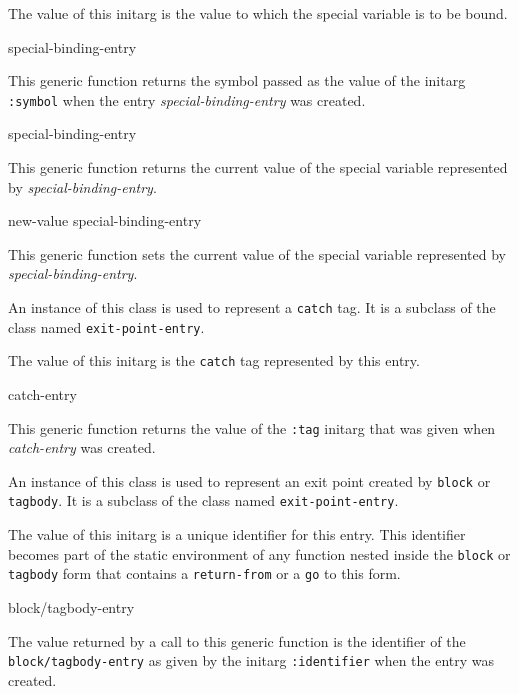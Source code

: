 
The value of this initarg is the value to which the special variable
is to be bound.

 {special-binding-entry}

This generic function returns the symbol passed as the value of the
initarg \texttt{:symbol} when the entry \textit{special-binding-entry}
was created.

 {special-binding-entry}

This generic function returns the current value of the special
variable represented by \textit{special-binding-entry}.

 {new-value special-binding-entry}

This generic function sets the current value of the special
variable represented by \textit{special-binding-entry}.


An instance of this class is used to represent a \texttt{catch} tag.
It is a subclass of the class named \texttt{exit-point-entry}.


The value of this initarg is the \texttt{catch} tag represented by
this entry.

 {catch-entry}

This generic function returns the value of the \texttt{:tag} initarg
that was given when \textit{catch-entry} was created.


An instance of this class is used to represent an exit point created
by \texttt{block} or \texttt{tagbody}.  It is a subclass of the class
named \texttt{exit-point-entry}.


The value of this initarg is a unique identifier for this entry.  This
identifier becomes part of the static environment of any function
nested inside the \texttt{block} or \texttt{tagbody} form that
contains a \texttt{return-from} or a \texttt{go} to this form.

 {block/tagbody-entry}

The value returned by a call to this generic function is the
identifier of the \texttt{block/tagbody-entry} as given by the initarg
\texttt{:identifier} when the entry was created.


